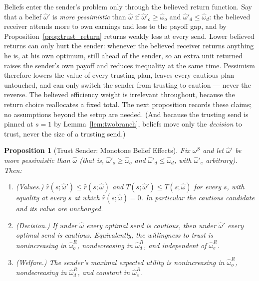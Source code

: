 \documentclass[11pt]{article}
\theoremstyle{plain}
\newtheorem{proposition}{Proposition}
\theoremstyle{remark}
\begin{document}
Beliefs enter the sender's problem only through the believed return function.  Say that a belief $\hat\omega'$ is \emph{more pessimistic} than $\hat\omega$ if $\hat\omega'_o\ge\hat\omega_o$ and $\hat\omega'_d\le\hat\omega_d$: the believed receiver attends more to own earnings and less to the payoff gap, and by Proposition~\ref{prop:trust_return} returns weakly less at every send.  Lower believed returns can only hurt the sender: whenever the believed receiver returns anything he is, at his own optimum, still ahead of the sender, so an extra unit returned raises the sender's own payoff and reduces inequality at the same time.  Pessimism therefore lowers the value of every trusting plan, leaves every cautious plan untouched, and can only switch the sender from trusting to caution --- never the reverse.  The believed efficiency weight is irrelevant throughout, because the return choice reallocates a fixed total.  The next proposition records these claims; no assumptions beyond the setup are needed.  (And because the trusting send is pinned at $s=1$ by Lemma~\ref{lem:twobranch}, beliefs move only the \emph{decision} to trust, never the size of a trusting send.)

\begin{proposition}[Trust Sender: Monotone Belief Effects]
\label{prop:trust_beliefs}
Fix $\omega^S$ and let $\hat\omega'$ be more pessimistic than $\hat\omega$ (that is, $\hat\omega'_o\ge\hat\omega_o$ and $\hat\omega'_d\le\hat\omega_d$, with $\hat\omega'_e$ arbitrary).  Then:
\begin{enumerate}[topsep=2pt,itemsep=2pt]
\item \emph{(Values.)}  $\hat r(s;\hat\omega')\le\hat r(s;\hat\omega)$ and $T(s;\hat\omega')\le T(s;\hat\omega)$ for every $s$, with equality at every $s$ at which $\hat r(s;\hat\omega)=0$.  In particular the cautious candidate and its value are unchanged.
\item \emph{(Decision.)}  If under $\hat\omega$ every optimal send is cautious, then under $\hat\omega'$ every optimal send is cautious.  Equivalently, the willingness to trust is nonincreasing in $\hat\omega_o^{R}$, nondecreasing in $\hat\omega_d^{R}$, and independent of $\hat\omega_e^{R}$.
\item \emph{(Welfare.)}  The sender's maximal expected utility is nonincreasing in $\hat\omega_o^{R}$, nondecreasing in $\hat\omega_d^{R}$, and constant in $\hat\omega_e^{R}$.
\end{enumerate}
\end{proposition}
\end{document}
